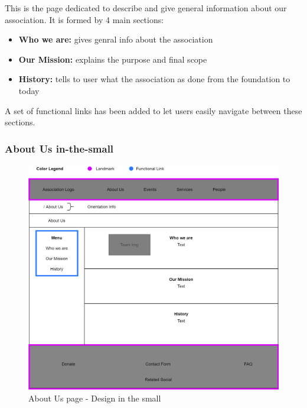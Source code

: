 This is the page dedicated to describe and give general information about our association. It is formed by 4 main sections: 
\begin{itemize}
	\item \textbf{Who we are: } gives genral info about the association
	\item \textbf{Our Mission: } explains the purpose and final scope
	\item \textbf{History: } tells to user what the association as done from the foundation to today
\end{itemize}
A set of functional links has been added to let users easily navigate between these sections.

\subsubsection{About Us in-the-small}
\begin{figure}[h!]
	\centering
	\begin{minipage}[b]{1\textwidth}
    		\includegraphics[width=\textwidth]{./assets/aboutus.png}
		\caption{About Us page - Design in the small}
	\end{minipage}
\end{figure}
\FloatBarrier

\clearpage

